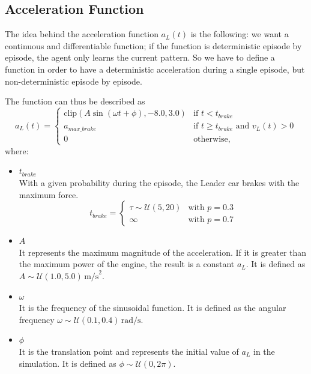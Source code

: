 \subsection{Acceleration Function}
The idea behind the acceleration function $a_L(t)$ is the following: we want a continuous and differentiable function; if the function is deterministic episode by episode, the agent only learns the current pattern. So we have to define a function in order to have a deterministic acceleration during a single episode, but non-deterministic episode by episode.

The function can thus be described as
\begin{equation}
    a_L(t) =
    \begin{cases}
        \text{clip}\left(A \sin(\omega t + \phi), -8.0, 3.0\right) & \text{if } t < t_{brake} \\
        a_{max\_brake} & \text{if } t \ge t_{brake} \text{ and } v_L(t) > 0 \\
        0 & \text{otherwise},
    \end{cases}
\end{equation}
where:
\begin{itemize}
    \item $t_{brake}$ \\
        With a given probability during the episode, the Leader car brakes with the maximum force.
        \begin{equation}
            t_{brake} =
            \begin{cases}
                \tau \sim \mathcal{U}(5, 20) & \text{with } p = 0.3 \\
                \infty & \text{with } p = 0.7
            \end{cases}
        \end{equation}
    \item $A$ \\
        It represents the maximum magnitude of the acceleration. If it is greater than the maximum power of the engine, the result is a constant $a_L$. It is defined as $A \sim \mathcal{U}(1.0, 5.0)\,\text{m/s}^2$.
    \item $\omega$ \\
        It is the frequency of the sinusoidal function. It is defined as the angular frequency $\omega \sim \mathcal{U}(0.1, 0.4)\,\text{rad/s}$.
    \item $\phi$ \\
        It is the translation point and represents the initial value of $a_L$ in the simulation. It is defined as $\phi \sim \mathcal{U}(0, 2\pi)$.
\end{itemize}

